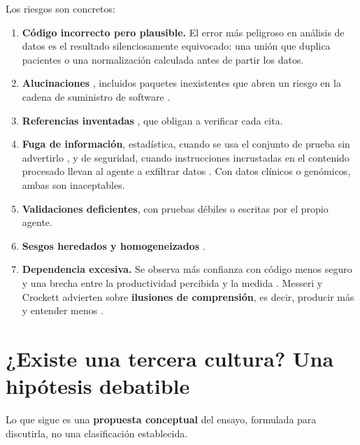 \documentclass[11pt,a4paper]{article}
\providecommand{\tightlist}{\setlength{\itemsep}{0pt}\setlength{\parskip}{0pt}}
\begin{document}
Los riesgos son concretos:

\begin{enumerate}
\def\labelenumi{\arabic{enumi}.}
\tightlist
\item
  \textbf{Código incorrecto pero plausible.} El error más peligroso en análisis de datos es el resultado silenciosamente equivocado: una unión que duplica pacientes o una normalización calculada antes de partir los datos.
\item
  \textbf{Alucinaciones} \autocite{ji2023}, incluidos paquetes inexistentes que abren un riesgo en la cadena de suministro de software \autocite{spracklen2025}.
\item
  \textbf{Referencias inventadas} \autocite{walters2023}, que obligan a verificar cada cita.
\item
  \textbf{Fuga de información}, estadística, cuando se usa el conjunto de prueba sin advertirlo \autocite{kapoor2023}, y de seguridad, cuando instrucciones incrustadas en el contenido procesado llevan al agente a exfiltrar datos \autocite{greshake2023}. Con datos clínicos o genómicos, ambas son inaceptables.
\item
  \textbf{Validaciones deficientes}, con pruebas débiles o escritas por el propio agente.
\item
  \textbf{Sesgos heredados y homogeneizados} \autocite{bommasani2021}.
\item
  \textbf{Dependencia excesiva.} Se observa más confianza con código menos seguro \autocite{perry2023} y una brecha entre la productividad percibida y la medida \autocite{becker2025}. Messeri y Crockett advierten sobre \textbf{ilusiones de comprensión}, es decir, producir más y entender menos \autocite{messeri2024}.
\end{enumerate}

\section{¿Existe una tercera cultura? Una hipótesis debatible}\label{sec-tercera}

\begin{recuadro}
Lo que sigue es una \textbf{propuesta conceptual} del ensayo, formulada para discutirla, no una clasificación establecida.
\end{recuadro}
\end{document}
